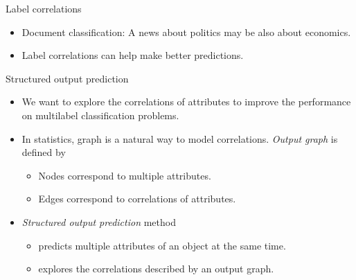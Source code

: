 \documentclass[first=purple,second=dgreen,logo=redexc]{aaltoslides}
\begin{document}
{\begin{frame}{Label correlations}
\begin{itemize}
{\begin{center}
		\end{center}}
		\item Document classification: A news about politics may be also about economics. 
		\item Label correlations can help make better predictions.
	\end{itemize}
\end{frame}


\begin{frame}{Structured output prediction}
	\begin{itemize}
		\item We want to explore the correlations of attributes to improve the performance on multilabel classification problems.
		\item In statistics, graph is a natural way to model correlations. \textit{Output graph} is defined by
		\begin{itemize}
			\footnotesize
			\item Nodes correspond to multiple attributes.
			\item Edges correspond to correlations of attributes.
		\end{itemize}
		\item \textit{Structured output prediction} method
		\begin{itemize}
			\footnotesize
			\item predicts multiple attributes of an object at the same time.
			\item explores the correlations described by an output graph.
		\end{itemize}
	\end{itemize}
\end{frame}

}
\end{document}
